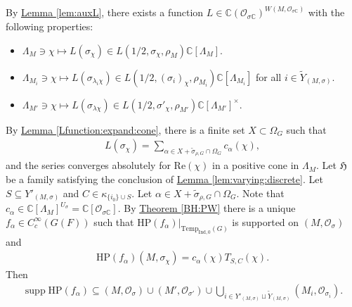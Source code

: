 \documentclass[10pt]{amsart}
\theoremstyle{definition}
\numberwithin{equation}{section}
\DeclareMathOperator{\supp}{\mathrm{supp}}
\numberwithin{equation}{subsection}
\newcommand{\CC}{\mathbb{C}}
\begin{document}
By \hyperref[lem:auxL]{Lemma \ref{lem:auxL}}, there exists a function $L\in \CC(\mathcal{O}_{\sigma\CC})^{W(M,\mathcal{O}_{\sigma\CC})}$ with the following properties:
\begin{itemize}
    \item $\Lambda_M\ni \chi \mapsto L(\sigma_\chi)\in L(1/2,\sigma_\chi,\rho_M)\CC[\Lambda_M].$
    \item $\Lambda_{M_i}\ni \chi \mapsto  L(\sigma_{\lambda_i\chi})\in L(1/2,(\sigma_i)_\chi,\rho_{M_i})\CC[\Lambda_{M_i}]$ for all $i\in \widetilde{Y}_{(M,\sigma)}.$
    \item $\Lambda_{M'}\ni \chi \mapsto L(\sigma_{\lambda\chi})\in L(1/2,\sigma'_\chi,\rho_{M'})\CC[\Lambda_{M'}]^\times$.
\end{itemize}
By \hyperref[Lfunction:expand:cone]{Lemma \ref{Lfunction:expand:cone}}, there is a finite set $X\subset \Omega_G$ such that
\begin{align*}
       L(\sigma_\chi) = \sum_{\alpha\in X + \widetilde{\sigma}_{\rho,G}\cap \Omega_G} c_\alpha(\chi),
\end{align*}
and the series converges absolutely for $\mathrm{Re}(\chi)$ in a positive cone in $\Lambda_{M}.$ Let $\mathfrak{H}$ be a family satisfying the conclusion of \hyperref[lem:varying:discrete]{Lemma \ref{lem:varying:discrete}}. Let $S\subseteq Y'_{(M,
\sigma)}$ and $C\in \kappa_{\{i_0\}\cup S}.$ Let $\alpha\in X+ \widetilde{\sigma}_{\rho,G}\cap \Omega_G.$ Note that $c_\alpha\in \CC[\Lambda_M]^{U_\sigma}=\CC[\mathcal{O}_{\sigma\CC}].$ By \hyperref[BH:PW]{Theorem \ref{BH:PW}} there is a unique $f_\alpha\in C^\infty_c(G(F))$ such that $\mathrm{HP}(f_\alpha)|_{\mathrm{Temp}_{\mathrm{Ind},0}(G)}$ is supported on $(M,\mathcal{O}_\sigma)$ and
\begin{align*}
    \mathrm{HP}(f_\alpha)(M,\sigma_{\chi})=c_\alpha(\chi)T_{S,C}(\chi).
\end{align*}
Then 
\begin{align*}
    \supp \mathrm{HP}(f_\alpha)\subseteq (M,\mathcal{O}_{\sigma})\cup (M',\mathcal{O}_{\sigma'})\cup \bigcup_{i\in  Y'_{(M,\sigma)}\sqcup\widetilde{Y}_{(M,\sigma)}} (M_i,\mathcal{O}_{\sigma_i}).
\end{align*}
\end{document}
